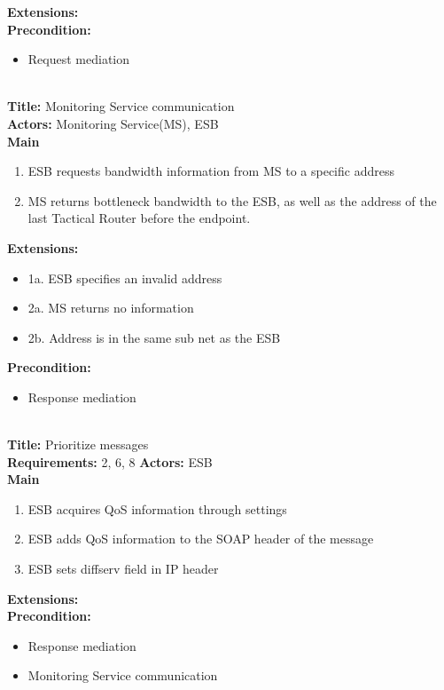     \textbf{Extensions:} \\
    \textbf{Precondition:}
    \begin{itemize}
        \item Request mediation
    \end{itemize}
    ~\\
    \textbf{Title:} Monitoring Service communication\\
    \textbf{Actors:} Monitoring Service(MS), ESB\\
    \textbf{Main}
    \begin{enumerate}
        \item ESB requests bandwidth information from MS to a specific address
        \item MS returns bottleneck bandwidth to the ESB, as well as the address of the last Tactical Router before the endpoint.
    \end{enumerate}
    \textbf{Extensions:}
    \begin{itemize}
        \item[]	1a. ESB specifies an invalid address
        \item[]	2a. MS returns no information
        \item[]	2b. Address is in the same sub net as the ESB
    \end{itemize}
    \textbf{Precondition:}
    \begin{itemize}
        \item Response mediation
    \end{itemize}
    ~\\
    \textbf{Title:} Prioritize messages\\
    \textbf{Requirements:} 2, 6, 8
    \textbf{Actors:} ESB\\
    \textbf{Main}
    \begin{enumerate}
        \item ESB acquires QoS information through settings
        \item ESB adds QoS information to the SOAP header of the message
        \item ESB sets diffserv field in IP header
    \end{enumerate}
    \textbf{Extensions:}\\
    \textbf{Precondition:}
    \begin{itemize}
        \item Response mediation
        \item Monitoring Service communication
    \end{itemize}

